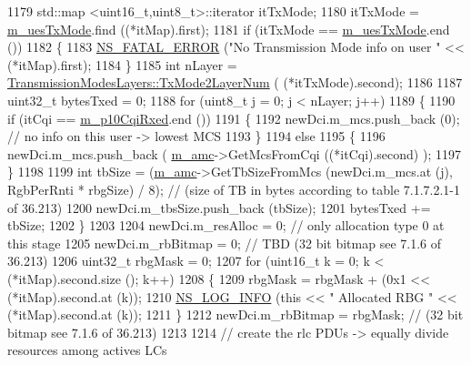 \begin{DoxyCode}
1179       std::map <uint16\_t,uint8\_t>::iterator itTxMode;
1180       itTxMode = \hyperlink{classns3_1_1FdBetFfMacScheduler_a1a3c593a10fbac9008cb1b991746dda2}{m\_uesTxMode}.find ((*itMap).first);
1181       \textcolor{keywordflow}{if} (itTxMode == \hyperlink{classns3_1_1FdBetFfMacScheduler_a1a3c593a10fbac9008cb1b991746dda2}{m\_uesTxMode}.end ())
1182         \{
1183           \hyperlink{group__fatal_ga5131d5e3f75d7d4cbfd706ac456fdc85}{NS\_FATAL\_ERROR} (\textcolor{stringliteral}{"No Transmission Mode info on user "} << (*itMap).first);
1184         \}
1185       \textcolor{keywordtype}{int} nLayer = \hyperlink{classns3_1_1TransmissionModesLayers_a31f608b7bfaa77440fe4cb85ad035329}{TransmissionModesLayers::TxMode2LayerNum} (
      (*itTxMode).second);
1186 
1187       uint32\_t bytesTxed = 0;
1188       \textcolor{keywordflow}{for} (uint8\_t j = 0; j < nLayer; j++)
1189         \{
1190           \textcolor{keywordflow}{if} (itCqi == \hyperlink{classns3_1_1FdBetFfMacScheduler_a122fbac27516524b54245db095d9162c}{m\_p10CqiRxed}.end ())
1191             \{
1192               newDci.m\_mcs.push\_back (0); \textcolor{comment}{// no info on this user -> lowest MCS}
1193             \}
1194           \textcolor{keywordflow}{else}
1195             \{
1196               newDci.m\_mcs.push\_back ( \hyperlink{classns3_1_1FdBetFfMacScheduler_ab6734e88a03f8d5085607802a0b49bbb}{m\_amc}->GetMcsFromCqi ((*itCqi).second) );
1197             \}
1198 
1199           \textcolor{keywordtype}{int} tbSize = (\hyperlink{classns3_1_1FdBetFfMacScheduler_ab6734e88a03f8d5085607802a0b49bbb}{m\_amc}->GetTbSizeFromMcs (newDci.m\_mcs.at (j), RgbPerRnti * rbgSize) / 8); \textcolor{comment}{//
       (size of TB in bytes according to table 7.1.7.2.1-1 of 36.213)}
1200           newDci.m\_tbsSize.push\_back (tbSize);
1201           bytesTxed += tbSize;
1202         \}
1203 
1204       newDci.m\_resAlloc = 0;  \textcolor{comment}{// only allocation type 0 at this stage}
1205       newDci.m\_rbBitmap = 0; \textcolor{comment}{// TBD (32 bit bitmap see 7.1.6 of 36.213)}
1206       uint32\_t rbgMask = 0;
1207       \textcolor{keywordflow}{for} (uint16\_t k = 0; k < (*itMap).second.size (); k++)
1208         \{
1209           rbgMask = rbgMask + (0x1 << (*itMap).second.at (k));
1210           \hyperlink{group__logging_gafbd73ee2cf9f26b319f49086d8e860fb}{NS\_LOG\_INFO} (\textcolor{keyword}{this} << \textcolor{stringliteral}{" Allocated RBG "} << (*itMap).second.at (k));
1211         \}
1212       newDci.m\_rbBitmap = rbgMask; \textcolor{comment}{// (32 bit bitmap see 7.1.6 of 36.213)}
1213 
1214       \textcolor{comment}{// create the rlc PDUs -> equally divide resources among actives LCs}

\end{DoxyCode}

